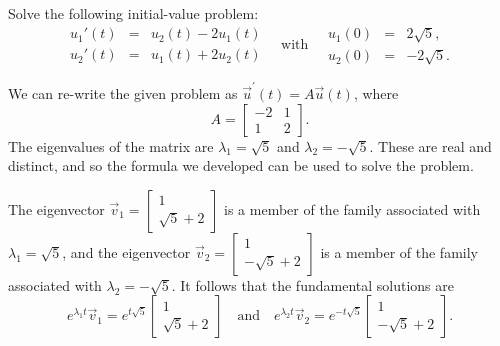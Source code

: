 \documentclass[../book.tex]{subfiles}
\begin{document}
\begin{example} \label{eg:DE-linear1}
Solve the following initial-value problem:
\begin{equation}\label{eq:sys-13}
\begin{array}{lcl}
  u_1'(t) &=& u_2(t) - 2 u_1(t) \\
  u_2'(t) &=&  u_1(t) + 2 u_2(t) 
\end{array}
\quad
\text{with}
\quad
\begin{array}{lcl}
  u_1(0) &=& 2\sqrt{5}, \\
  u_2(0) &=& -2\sqrt{5}.
\end{array}
\end{equation}
\end{example}
\begin{solution}
We can re-write the given problem as \(\vec{u}^{ \prime}(t) = A \vec{u}(t)\), where
\begin{equation}\label{eq:sys-14}
A =
\begin{bmatrix}
  -2 & 1 \\ 1 & 2
\end{bmatrix}.
\end{equation}
The eigenvalues of the matrix are \(\lambda_1 = \sqrt{5}\) and \(\lambda_2=-\sqrt{5}\). These are real and distinct, and so the formula we developed can be used to solve the problem.

The eigenvector \(\vec{v}_1 = \begin{bmatrix} 1 \\ \sqrt{5}+2 \end{bmatrix}\) is a member of the family associated with \(\lambda_1=\sqrt{5}\), and the eigenvector \(\vec{v}_2 = \begin{bmatrix} 1 \\ -\sqrt{5}+2 \end{bmatrix}\) is a member of the family associated with \(\lambda_2 = -\sqrt{5}\). It follows that the fundamental solutions are
\begin{equation}\label{eq:sys-15}
e^{\lambda_1  t}  \vec{v}_1
=
e^{t\sqrt{5}} 
\begin{bmatrix}
  1 \\ \sqrt{5}+2
\end{bmatrix}
\quad \text{and} \quad
e^{\lambda_2  t}  \vec{v}_2
=
e^{-t\sqrt{5}} 
\begin{bmatrix}
  1 \\ -\sqrt{5}+2
\end{bmatrix}.
\end{equation}


\end{solution}
\end{document}

